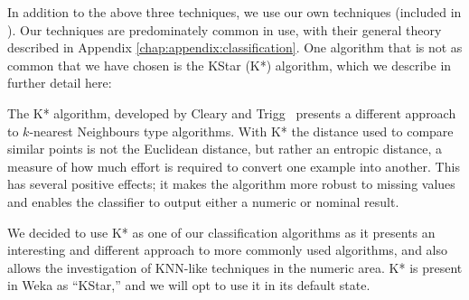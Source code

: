\documentclass[../thesis/thesis.tex]{subfiles}
\begin{document}
In addition to the above three techniques, we use our own techniques (included in ). Our techniques are predominately common in use, with their general theory described in Appendix \ref{chap:appendix:classification}. One algorithm that is not as common that we have chosen is the KStar (K*) algorithm, which we describe in further detail here:

The K* algorithm, developed by Cleary and Trigg~\cite{cleary1995k} presents a different approach to $k$-nearest Neighbours type algorithms. With K* the distance used to compare similar points is not the Euclidean distance, but rather an entropic distance, a measure of how much effort is required to convert one example into another. This has several positive effects; it makes the algorithm more robust to missing values and enables the classifier to output either a numeric or nominal result.

We decided to use K* as one of our classification algorithms as it presents an interesting and different approach to more commonly used algorithms, and also allows the investigation of KNN-like techniques in the numeric area. K* is present in Weka as ``KStar,'' and we will opt to use it in its default state.
\end{document}
